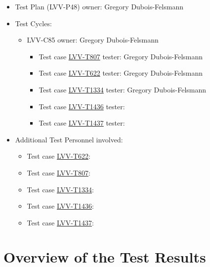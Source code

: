 \documentclass[DM,lsstdraft,STR,toc]{lsstdoc}
\begin{document}
\begin{itemize}
\item Test Plan (LVV-P48) owner: Gregory Dubois-Felsmann
\item Test Cycles:
\begin{itemize}
  \item LVV-C85 owner: 
    Gregory Dubois-Felsmann
  \begin{itemize}
    \item Test case \href{https://jira.lsstcorp.org/secure/Tests.jspa#/testCase/LVV-T807}{LVV-T807} tester: Gregory Dubois-Felsmann
    \item Test case \href{https://jira.lsstcorp.org/secure/Tests.jspa#/testCase/LVV-T622}{LVV-T622} tester: Gregory Dubois-Felsmann
    \item Test case \href{https://jira.lsstcorp.org/secure/Tests.jspa#/testCase/LVV-T1334}{LVV-T1334} tester: Gregory Dubois-Felsmann
    \item Test case \href{https://jira.lsstcorp.org/secure/Tests.jspa#/testCase/LVV-T1436}{LVV-T1436} tester: 
    \item Test case \href{https://jira.lsstcorp.org/secure/Tests.jspa#/testCase/LVV-T1437}{LVV-T1437} tester: 
  \end{itemize}
\end{itemize}
\item Additional Test Personnel involved:
  \begin{itemize}
    \item Test case \href{https://jira.lsstcorp.org/secure/Tests.jspa#/testCase/LVV-T622}{LVV-T622}: 
    \item Test case \href{https://jira.lsstcorp.org/secure/Tests.jspa#/testCase/LVV-T807}{LVV-T807}: 
    \item Test case \href{https://jira.lsstcorp.org/secure/Tests.jspa#/testCase/LVV-T1334}{LVV-T1334}: 
    \item Test case \href{https://jira.lsstcorp.org/secure/Tests.jspa#/testCase/LVV-T1436}{LVV-T1436}: 
    \item Test case \href{https://jira.lsstcorp.org/secure/Tests.jspa#/testCase/LVV-T1437}{LVV-T1437}: 
  \end{itemize}
\end{itemize}

\newpage

\section{Overview of the Test Results}
\label{sect:overview}
\end{document}
